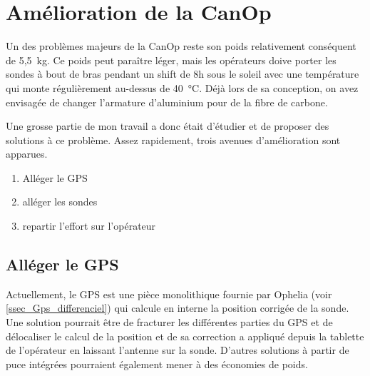 \section{Amélioration de la CanOp}

Un des problèmes majeurs de la CanOp reste son poids relativement conséquent de 5,5~kg. Ce poids peut paraître léger, mais les opérateurs doive porter les sondes à bout de bras pendant un shift de 8h sous le soleil avec une température qui monte régulièrement au-dessus de 40~°C. Déjà lors de sa conception, on avez envisagée de changer l'armature d'aluminium pour de la fibre de carbone.

Une grosse partie de mon travail a donc était d'étudier et de proposer des solutions à ce problème. Assez rapidement, trois avenues d'amélioration sont apparues.
\begin{enumerate}
    \item Alléger le GPS
    \item alléger les sondes
    \item repartir l'effort sur l'opérateur
\end{enumerate}

\subsection{Alléger le GPS}
Actuellement, le GPS est une pièce monolithique fournie par Ophelia (voir \cref{ssec_Gps_differenciel}) qui calcule en interne la position corrigée de la sonde. Une solution pourrait être de fracturer les différentes parties du GPS et de délocaliser le calcul de la position et de sa correction a appliqué depuis la tablette de l'opérateur en laissant l'antenne sur la sonde. D'autres solutions à partir de puce intégrées pourraient également mener à des économies de poids.

